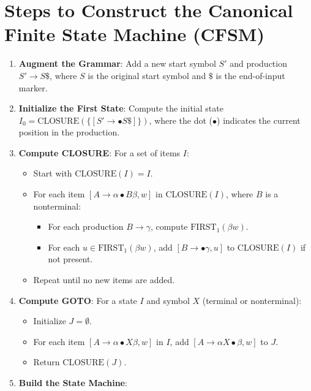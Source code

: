 \section*{Steps to Construct the Canonical Finite State Machine (CFSM)}
\begin{enumerate}
    \item \textbf{Augment the Grammar}: Add a new start symbol \( S' \) and production \( S' \to S \$ \), where \( S \) is the original start symbol and \( \$ \) is the end-of-input marker.
    \item \textbf{Initialize the First State}: Compute the initial state \( I_0 = \text{CLOSURE}(\{[S' \to \bullet S \$]\}) \), where the dot (\(\bullet\)) indicates the current position in the production.
    \item \textbf{Compute CLOSURE}: For a set of items \( I \):
        \begin{itemize}
            \item Start with \( \text{CLOSURE}(I) = I \).
            \item For each item \( [A \to \alpha \bullet B \beta, w] \) in \( \text{CLOSURE}(I) \), where \( B \) is a nonterminal:
                \begin{itemize}
                    \item For each production \( B \to \gamma \), compute \( \text{FIRST}_1(\beta w) \).
                    \item For each \( u \in \text{FIRST}_1(\beta w) \), add \( [B \to \bullet \gamma, u] \) to \( \text{CLOSURE}(I) \) if not present.
                \end{itemize}
            \item Repeat until no new items are added.
        \end{itemize}
    \item \textbf{Compute GOTO}: For a state \( I \) and symbol \( X \) (terminal or nonterminal):
        \begin{itemize}
            \item Initialize \( J = \emptyset \).
            \item For each item \( [A \to \alpha \bullet X \beta, w] \) in \( I \), add \( [A \to \alpha X \bullet \beta, w] \) to \( J \).
            \item Return \( \text{CLOSURE}(J) \).
        \end{itemize}
    \item \textbf{Build the State Machine}:
        \begin{itemize}

\end{itemize}
\end{enumerate}
